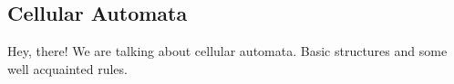 
\subsection{Cellular Automata}
Hey, there! We are talking about cellular automata. Basic structures and some well acquainted rules.
